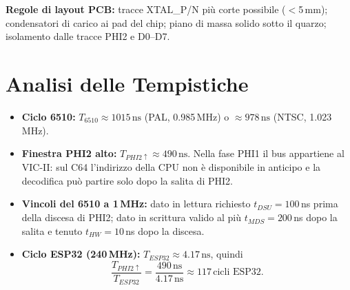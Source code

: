 \documentclass[12pt, a4paper]{article}
\begin{document}
\noindent\textbf{Regole di layout PCB:} tracce XTAL\_P/N più corte possibile ($<$5\,mm); condensatori di carico ai pad del chip; piano di massa solido sotto il quarzo; isolamento dalle tracce PHI2 e D0--D7.

\section{Analisi delle Tempistiche}

\begin{itemize}
    \item {\bfseries Ciclo 6510:} $T_{6510} \approx 1015\,\text{ns}$ (PAL, 0.985\,MHz) o $\approx 978\,\text{ns}$ (NTSC, 1.023\,MHz).
    \item {\bfseries Finestra PHI2 alto:} $T_{PHI2\uparrow} \approx 490\,\text{ns}$. Nella fase PHI1 il bus appartiene al VIC-II: sul C64 l'indirizzo della CPU non è disponibile in anticipo e la decodifica può partire solo dopo la salita di PHI2.
    \item {\bfseries Vincoli del 6510 a 1\,MHz:} dato in lettura richiesto $t_{DSU} = 100$\,ns prima della discesa di PHI2; dato in scrittura valido al più $t_{MDS} = 200$\,ns dopo la salita e tenuto $t_{HW} = 10$\,ns dopo la discesa.
    \item {\bfseries Ciclo ESP32 (240\,MHz):} $T_{ESP32} \approx 4.17\,\text{ns}$, quindi
    \[
    \frac{T_{PHI2\uparrow}}{T_{ESP32}} = \frac{490\,\text{ns}}{4.17\,\text{ns}} \approx 117\,\text{cicli ESP32}.
    \]
\end{itemize}
\end{document}
